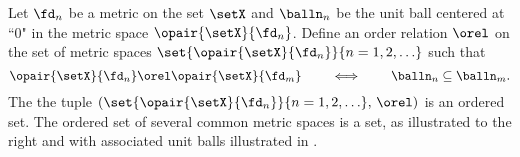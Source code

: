 \begin{minipage}[c]{3\tw/4}
\begin{example}
\label{ex:order_metric}
\footnotemark
Let $\fd_n$ be a metric on the set $\setX$
and $\balln_n$ be the unit ball centered at ``$0$" in the metric space $\opair{\setX}{\fd_n}$.
Define an order relation $\orel$ on the set of metric spaces
$\set{\opair{\setX}{\fd_n}}{n=1,2,\ldots}$
such that
  \[ \opair{\setX}{\fd_n} \orel \opair{\setX}{\fd_m} \qquad\iff\qquad \balln_n \subseteq \balln_m. \]
The the tuple $(\set{\opair{\setX}{\fd_n}}{n=1,2,\ldots},\, \orel)$
is an ordered set.
The ordered set of several common metric spaces is a  set,
as illustrated to the right and with associated unit balls illustrated in 
.
\end{example}
\end{minipage}%
%
